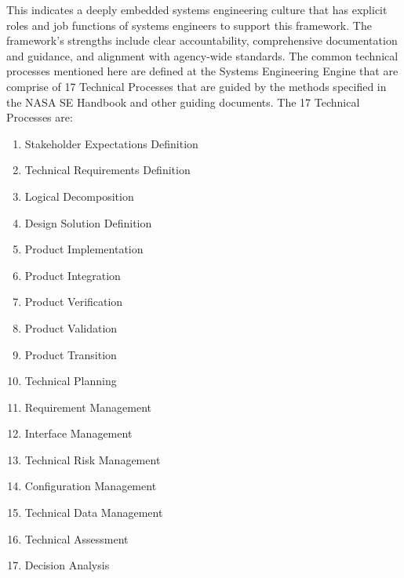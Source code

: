 This indicates a deeply embedded systems engineering culture that has explicit roles and job functions of systems engineers to support this framework. 
The framework’s strengths include clear accountability, comprehensive documentation and guidance, and alignment with agency-wide standards. 
The common technical processes mentioned here are defined at the Systems Engineering Engine \cite{npr7123.1D} that are comprise of 17 Technical Processes that are guided by the methods specified in the NASA SE Handbook \cite{nasa2016handbook} and other guiding documents. The 17 Technical Processes are:
\begin{enumerate}[noitemsep, topsep=0pt]
    \item Stakeholder Expectations Definition
    \item Technical Requirements Definition
    \item Logical Decomposition
    \item Design Solution Definition
    \item Product Implementation
    \item Product Integration
    \item Product Verification
    \item Product Validation
    \item Product Transition
    \item Technical Planning
    \item Requirement Management
    \item Interface Management
    \item Technical Risk Management
    \item Configuration Management
    \item Technical Data Management
    \item Technical Assessment
    \item Decision Analysis
\end{enumerate}
